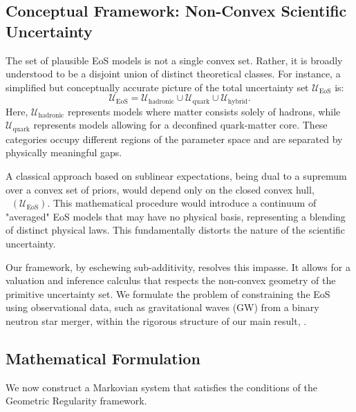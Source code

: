 \documentclass[12pt, letterpaper]{amsart}
\newcommand{\Ucal}{\mathcal{U}}
\DeclareMathOperator*{\overlineconv}{\overline{conv}}
\theoremstyle{plain}
\theoremstyle{definition}
\theoremstyle{remark}
\numberwithin{equation}{section} %
\begin{document}
\subsection{Conceptual Framework: Non-Convex Scientific Uncertainty}
The set of plausible EoS models is not a single convex set. Rather, it is broadly understood to be a disjoint union of distinct theoretical classes. For instance, a simplified but conceptually accurate picture of the total uncertainty set \(\Ucal_{\text{EoS}}\) is:
\[ \Ucal_{\text{EoS}} = \Ucal_{\text{hadronic}} \cup \Ucal_{\text{quark}} \cup \Ucal_{\text{hybrid}}. \]
Here, \(\Ucal_{\text{hadronic}}\) represents models where matter consists solely of hadrons, while \(\Ucal_{\text{quark}}\) represents models allowing for a deconfined quark-matter core. These categories occupy different regions of the parameter space and are separated by physically meaningful gaps.

A classical approach based on sublinear expectations, being dual to a supremum over a convex set of priors, would depend only on the closed convex hull, \(\overlineconv(\Ucal_{\text{EoS}})\). This mathematical procedure would introduce a continuum of "averaged" EoS models that may have no physical basis, representing a blending of distinct physical laws. This fundamentally distorts the nature of the scientific uncertainty.

Our framework, by eschewing sub-additivity, resolves this impasse. It allows for a valuation and inference calculus that respects the non-convex geometry of the primitive uncertainty set. We formulate the problem of constraining the EoS using observational data, such as gravitational waves (GW) from a binary neutron star merger, within the rigorous structure of our main result, .

\subsection{Mathematical Formulation}
We now construct a Markovian system that satisfies the conditions of the Geometric Regularity framework.
\end{document}
